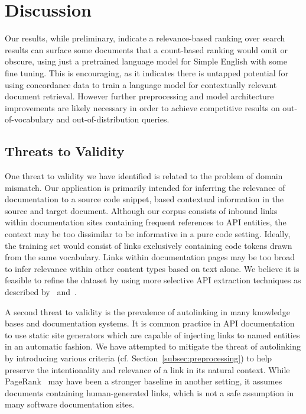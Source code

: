 \documentclass[sigconf,authordraft]{acmart}
\begin{document}
\section{Discussion}

Our results, while preliminary, indicate a relevance-based ranking over search results can surface some documents that a count-based ranking would omit or obscure, using just a pretrained language model for Simple English with some fine tuning. This is encouraging, as it indicates there is untapped potential for using concordance data to train a language model for contextually relevant document retrieval. However further preprocessing and model architecture improvements are likely necessary in order to achieve competitive results on out-of-vocabulary and out-of-distribution queries.

\subsection{Threats to Validity}\label{subsec:threats}

One threat to validity we have identified is related to the problem of domain mismatch. Our application is primarily intended for inferring the relevance of documentation to a source code snippet, based contextual information in the source and target document. Although our corpus consists of inbound links within documentation sites containing frequent references to API entities, the context may be too dissimilar to be informative in a pure code setting. Ideally, the training set would consist of links exclusively containing code tokens drawn from the same vocabulary. Links within documentation pages may be too broad to infer relevance within other content types based on text alone. We believe it is feasible to refine the dataset by using more selective API extraction techniques as described by~\citet{ma2019easy} and~\citet{ye2016learning, Ye:2018:AAR:3296848.3296902}.

A second threat to validity is the prevalence of autolinking in many knowledge bases and documentation systems. It is common practice in API documentation to use static site generators which are capable of injecting links to named entities in an automatic fashion. We have attempted to mitigate the threat of autolinking by introducing various criteria (cf. Section~\ref{subsec:preprocessing}) to help preserve the intentionality and relevance of a link in its natural context. While PageRank~\cite{page1999pagerank} may have been a stronger baseline in another setting, it assumes documents containing human-generated links, which is not a safe assumption in many software documentation sites.
\end{document}
